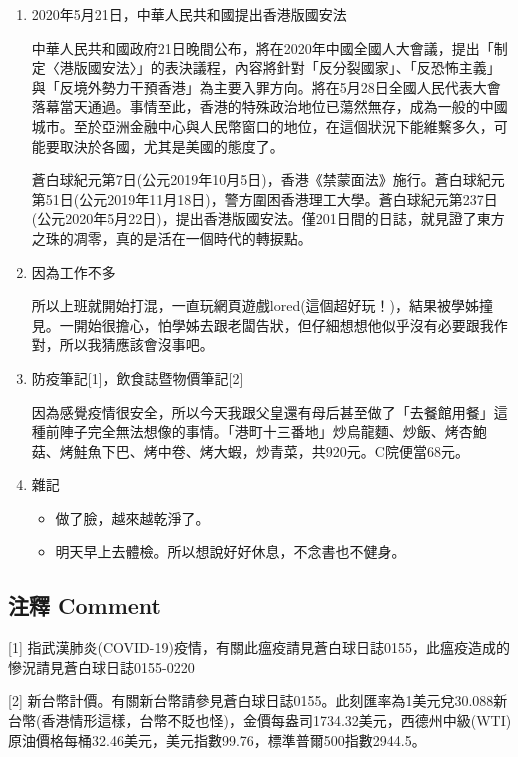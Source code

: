\documentclass[a5paper, 12pt
]{book}
\providecommand{\tightlist}{%
  \setlength{\itemsep}{0pt}\setlength{\parskip}{0pt}}
\begin{document}
\begin{enumerate}
\def\labelenumi{\arabic{enumi}.}
\item
  2020年5月21日，中華人民共和國提出香港版國安法

  中華人民共和國政府21日晚間公布，將在2020年中國全國人大會議，提出「制定〈港版國安法〉」的表決議程，內容將針對「反分裂國家」、「反恐怖主義」與「反境外勢力干預香港」為主要入罪方向。將在5月28日全國人民代表大會落幕當天通過。事情至此，香港的特殊政治地位已蕩然無存，成為一般的中國城市。至於亞洲金融中心與人民幣窗口的地位，在這個狀況下能維繫多久，可能要取決於各國，尤其是美國的態度了。

  蒼白球紀元第7日(公元2019年10月5日)，香港《禁蒙面法》施行。蒼白球紀元第51日(公元2019年11月18日)，警方圍困香港理工大學。蒼白球紀元第237日(公元2020年5月22日)，提出香港版國安法。僅201日間的日誌，就見證了東方之珠的凋零，真的是活在一個時代的轉捩點。
\item
  因為工作不多

  所以上班就開始打混，一直玩網頁遊戲lored(這個超好玩！)，結果被學姊撞見。一開始很擔心，怕學姊去跟老闆告狀，但仔細想想他似乎沒有必要跟我作對，所以我猜應該會沒事吧。
\item
  防疫筆記{[}1{]}，飲食誌暨物價筆記{[}2{]}

  因為感覺疫情很安全，所以今天我跟父皇還有母后甚至做了「去餐館用餐」這種前陣子完全無法想像的事情。「港町十三番地」炒烏龍麵、炒飯、烤杏鮑菇、烤鮭魚下巴、烤中卷、烤大蝦，炒青菜，共920元。C院便當68元。
\item
  雜記

  \begin{itemize}
  \tightlist
  \item
    做了臉，越來越乾淨了。
  \item
    明天早上去體檢。所以想說好好休息，不念書也不健身。
  \end{itemize}
\end{enumerate}

\hypertarget{ux6ce8ux91cb-comment-82}{%
\subsection{注釋 Comment}\label{ux6ce8ux91cb-comment-82}}

{[}1{]}
指武漢肺炎(COVID-19)疫情，有關此瘟疫請見蒼白球日誌0155，此瘟疫造成的慘況請見蒼白球日誌0155-0220

{[}2{]}
新台幣計價。有關新台幣請參見蒼白球日誌0155。此刻匯率為1美元兌30.088新台幣(香港情形這樣，台幣不貶也怪)，金價每盎司1734.32美元，西德州中級(WTI)原油價格每桶32.46美元，美元指數99.76，標準普爾500指數2944.5。
\end{document}
